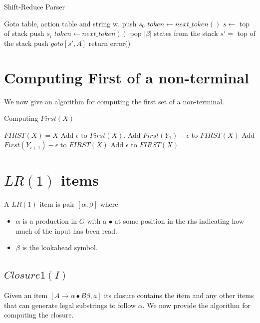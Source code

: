 \documentclass[oneside]{book}
\begin{document}
\begin{algorithm}
\caption{Shift-Reduce Parser}
\begin{algorithmic}
\REQUIRE Goto table, action table and string w. 
\STATE push $s_0$
\STATE $token \leftarrow next\_token()$ 
\STATE $s \leftarrow $ top of stack
\STATE push $s_i$
\STATE $token \leftarrow next\_token()$ 
\STATE pop $|\beta|$ states from the stack
\STATE $s' = $ top of the stack
\STATE push $goto[s',A]$
\STATE return
\ELSE
\STATE error()
\ENDIF
\ENDWHILE
\end{algorithmic}
\end{algorithm}

\section{Computing First of a non-terminal}
We now give an algorithm for computing the first set of a non-terminal.

\begin{algorithm}
\caption{Computing $First(X)$}
\begin{algorithmic}
\STATE $FIRST(X) = X$
\ENDIF
{}
\STATE Add $\epsilon$ to $First(X)$.
\ENDIF
{}
\STATE Add $First(Y_1) - \epsilon$ to $FIRST(X)$
\STATE Add $First(Y_{i+1}) - \epsilon$ to $FIRST(X)$
\ENDIF
\ENDFOR
{}
\STATE Add $\epsilon$ to $FIRST(X)$
\ENDIF
\ENDIF
\end{algorithmic}
\end{algorithm}

\section{$LR(1)$ items}

A $LR(1)$ item is pair $[\alpha,\beta]$ where 
\begin{itemize}
\item $\alpha$ is a production in $G$ with a $\bullet$ at some position in the rhs indicating how much of the input has been read.
\item $\beta$ is the lookahead symbol.
\end{itemize}

\subsection{$Closure1(I)$}
Given an item $[A \rightarrow \alpha \bullet B \beta, a]$ its closure contains the item and any other items that can generate legal substrings to follow $\alpha$. We now provide the algorithm for computing the closure.
\end{document}
